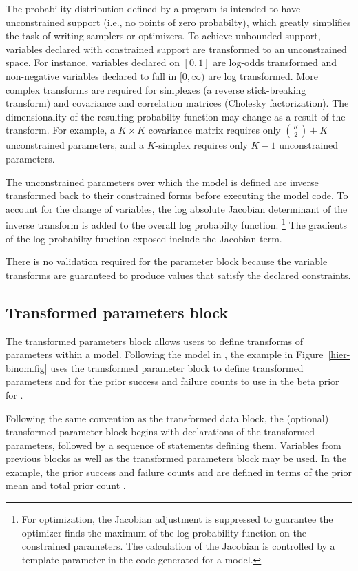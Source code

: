 \documentclass[article]{jss}
\begin{document}
The probability distribution defined by a  program is
intended to have unconstrained support (i.e., no points of zero
probabilty), which greatly simplifies the task of writing samplers or
optimizers.  To achieve unbounded support, variables declared with
constrained support are transformed to an unconstrained space.  For
instance, variables declared on $[0,1]$ are log-odds transformed and
non-negative variables declared to fall in $[0,\infty)$ are log
transformed.  More complex transforms are required for simplexes (a
reverse stick-breaking transform) and covariance and correlation
matrices (Cholesky factorization).  The dimensionality of the
resulting probabilty function may change as a result of the
transform. For example, a $K \times K$ covariance matrix requires only
${K \choose 2} + K$ unconstrained parameters, and a $K$-simplex
requires only $K-1$ unconstrained parameters.

The unconstrained parameters over which the model is defined are
inverse transformed back to their constrained forms before executing
the model code.  To account for the change of variables, the log
absolute Jacobian determinant of the inverse transform is added to the
overall log probabilty function.%
%
\footnote{For optimization, the Jacobian adjustment is suppressed to
  guarantee the optimizer finds the maximum of the log probability
  function on the constrained parameters.  The calculation of the
  Jacobian is controlled by a template parameter in the 
  code generated for a model.}
%
The gradients of the log probabilty function exposed include the
Jacobian term.  

There is no validation required for the parameter block because the
variable transforms are guaranteed to produce values that satisfy the
declared constraints.


\subsection{Transformed parameters block}

The transformed parameters block allows users to define transforms of
parameters within a model.  Following the model in
\citep{GelmanEtAl:2013}, the example in Figure~\ref{hier-binom.fig}
uses the transformed parameter block to define transformed parameters
 and  for the prior success and failure counts
to use in the beta prior for .  

Following the same convention as the transformed data block, the
(optional) transformed parameter block begins with declarations of the
transformed parameters, followed by a sequence of statements defining
them.  Variables from previous blocks as well as the transformed
parameters block may be used.  In the example, the prior success and
failure counts  and  are defined in terms of
the prior mean  and total prior count .
\end{document}
